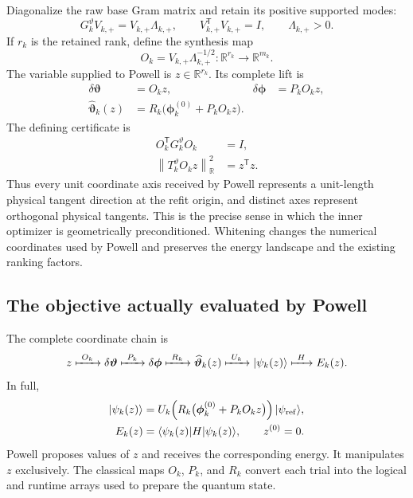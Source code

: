 \documentclass[10pt,twocolumn]{article}
\newcommand{\ket}[1]{\lvert #1\rangle}
\newcommand{\bra}[1]{\langle #1\rvert}
\begin{document}
Diagonalize the raw base Gram matrix and retain its positive supported
modes:
\begin{equation}
G_k^{\vartheta}V_{k,+}=V_{k,+}\Lambda_{k,+},
\qquad
V_{k,+}^{\mathsf T}V_{k,+}=I,
\qquad
\Lambda_{k,+}>0.
\label{eq:sr-refit-supported-spectrum}
\end{equation}
If \(r_k\) is the retained rank, define the synthesis map
\begin{equation}
O_k=V_{k,+}\Lambda_{k,+}^{-1/2}
:\mathbb R^{r_k}\longrightarrow\mathbb R^{m_k}.
\label{eq:sr-refit-orthonormalizer}
\end{equation}
The variable supplied to Powell is
\(z\in\mathbb R^{r_k}\). Its complete lift is
\begin{align}
\delta\bm\vartheta&=O_kz,
&\delta\bm\phi&=P_kO_kz,\nonumber\\
\widehat{\bm\vartheta}_k(z)
&=R_k\bigl(\bm\phi_k^{(0)}+P_kO_kz\bigr).
\label{eq:sr-refit-whitened-lift}
\end{align}
The defining certificate is
\begin{align}
O_k^{\mathsf T}G_k^{\vartheta}O_k&=I,\nonumber\\
\left\|T_k^{\vartheta}O_kz\right\|_{\mathbb R}^2
&=z^{\mathsf T}z.
\label{eq:sr-refit-whitened-length}
\end{align}
Thus every unit coordinate axis received by Powell represents a unit-length
physical tangent direction at the refit origin, and distinct axes represent
orthogonal physical tangents. This is the precise sense in which the inner
optimizer is geometrically preconditioned. Whitening changes the numerical
coordinates used by Powell and preserves the energy landscape and the
existing ranking factors.

\subsection*{The objective actually evaluated by Powell}

The complete coordinate chain is
\begin{equation}
z\xmapsto{\ O_k\ }\delta\bm\vartheta
\xmapsto{\ P_k\ }\delta\bm\phi
\xmapsto{\ R_k\ }\widehat{\bm\vartheta}_k(z)
\xmapsto{\ U_k\ }\ket{\psi_k(z)}
\xmapsto{\ H\ }E_k(z).
\label{eq:sr-refit-coordinate-chain}
\end{equation}
In full,
\begin{align}
\ket{\psi_k(z)}
&=U_k\!\left(
R_k\bigl(\bm\phi_k^{(0)}+P_kO_kz\bigr)
\right)\ket{\psi_{\rm ref}},\nonumber\\
E_k(z)&=\bra{\psi_k(z)}H\ket{\psi_k(z)},
\qquad z^{(0)}=0.
\label{eq:sr-refit-powell-objective}
\end{align}
Powell proposes values of \(z\) and receives the corresponding energy. It
manipulates \(z\) exclusively. The classical maps \(O_k\), \(P_k\), and
\(R_k\) convert each trial into the logical and runtime arrays used to prepare
the quantum state.
\end{document}
